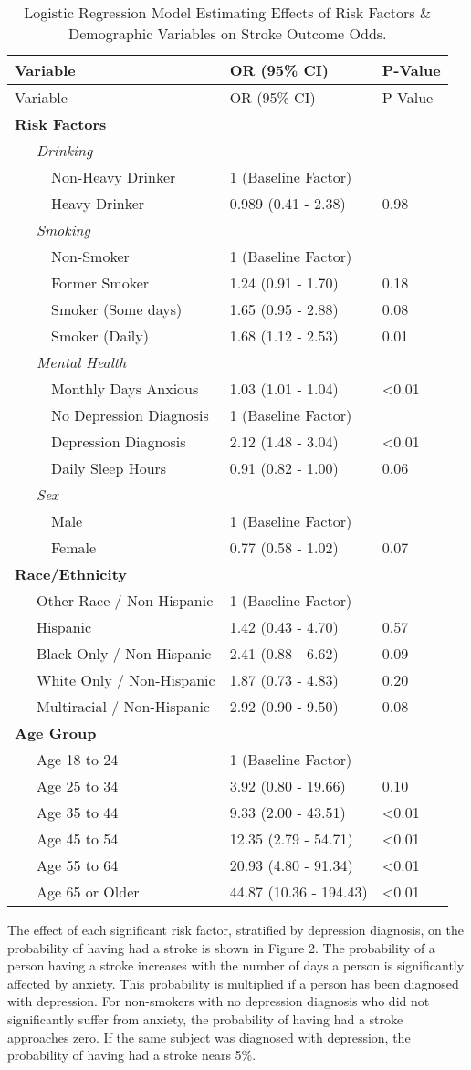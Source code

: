 \documentclass[11pt,]{article}
\begin{document}
\begin{longtable}[]{@{}lll@{}}
\caption{Logistic Regression Model Estimating Effects of Risk Factors \&
Demographic Variables on Stroke Outcome Odds.}\tabularnewline
\toprule
Variable & OR (95\% CI) & P-Value\tabularnewline
\midrule
\endfirsthead
\toprule
Variable & OR (95\% CI) & P-Value\tabularnewline
\midrule
\endhead
\textbf{Risk Factors} & &\tabularnewline
~~~\emph{Drinking} & &\tabularnewline
~~~~~Non-Heavy Drinker & 1 (Baseline Factor) &\tabularnewline
~~~~~Heavy Drinker & 0.989 (0.41 - 2.38) & 0.98\tabularnewline
~~~\emph{Smoking} & &\tabularnewline
~~~~~Non-Smoker & 1 (Baseline Factor) &\tabularnewline
~~~~~Former Smoker & 1.24 (0.91 - 1.70) & 0.18\tabularnewline
~~~~~Smoker (Some days) & 1.65 (0.95 - 2.88) & 0.08\tabularnewline
~~~~~Smoker (Daily) & 1.68 (1.12 - 2.53) & 0.01\tabularnewline
~~~\emph{Mental Health} & &\tabularnewline
~~~~~Monthly Days Anxious & 1.03 (1.01 - 1.04) &
\textless{}0.01\tabularnewline
~~~~~No Depression Diagnosis & 1 (Baseline Factor) &\tabularnewline
~~~~~Depression Diagnosis & 2.12 (1.48 - 3.04) &
\textless{}0.01\tabularnewline
~~~~~Daily Sleep Hours & 0.91 (0.82 - 1.00) & 0.06\tabularnewline
~~~\emph{Sex} & &\tabularnewline
~~~~~Male & 1 (Baseline Factor) &\tabularnewline
~~~~~Female & 0.77 (0.58 - 1.02) & 0.07\tabularnewline
\textbf{Race/Ethnicity} & &\tabularnewline
~~~Other Race / Non-Hispanic & 1 (Baseline Factor) &\tabularnewline
~~~Hispanic & 1.42 (0.43 - 4.70) & 0.57\tabularnewline
~~~Black Only / Non-Hispanic & 2.41 (0.88 - 6.62) & 0.09\tabularnewline
~~~White Only / Non-Hispanic & 1.87 (0.73 - 4.83) & 0.20\tabularnewline
~~~Multiracial / Non-Hispanic & 2.92 (0.90 - 9.50) & 0.08\tabularnewline
\textbf{Age Group} & &\tabularnewline
~~~Age 18 to 24 & 1 (Baseline Factor) &\tabularnewline
~~~Age 25 to 34 & 3.92 (0.80 - 19.66) & 0.10\tabularnewline
~~~Age 35 to 44 & 9.33 (2.00 - 43.51) & \textless{}0.01\tabularnewline
~~~Age 45 to 54 & 12.35 (2.79 - 54.71) & \textless{}0.01\tabularnewline
~~~Age 55 to 64 & 20.93 (4.80 - 91.34) & \textless{}0.01\tabularnewline
~~~Age 65 or Older & 44.87 (10.36 - 194.43) &
\textless{}0.01\tabularnewline
\bottomrule
\end{longtable}

The effect of each significant risk factor, stratified by depression
diagnosis, on the probability of having had a stroke is shown in Figure
2. The probability of a person having a stroke increases with the number
of days a person is significantly affected by anxiety. This probability
is multiplied if a person has been diagnosed with depression. For
non-smokers with no depression diagnosis who did not significantly
suffer from anxiety, the probability of having had a stroke approaches
zero. If the same subject was diagnosed with depression, the probability
of having had a stroke nears 5\%.
\end{document}
